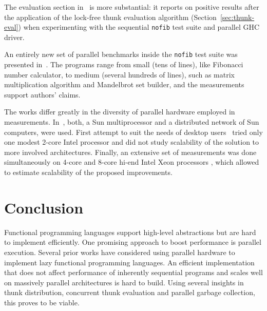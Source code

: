 \documentclass[11pt]{extarticle}
\begin{document}
The evaluation section in~\cite{Harris05} is more substantial: it reports on positive results after the application of the lock-free thunk evaluation algorithm (Section~\ref{sec:thunk-eval}) when experimenting with the sequential \texttt{nofib} test suite and parallel GHC driver.

An entirely new set of parallel benchmarks inside the \texttt{nofib} test suite was presented in~\cite{Marlow09}. The programs range from small (tens of lines), like Fibonacci number calculator, to medium (several hundreds of lines), such as matrix multiplication algorithm and Mandelbrot set builder, and the measurements support authors' claims.

The works differ greatly in the diversity of parallel hardware employed in measurements. In~\cite{Trinder96}, both, a Sun multiprocessor and a distributed network of Sun computers, were used. First attempt to suit the needs of desktop users~\cite{Harris05} tried only one modest 2-core Intel processor and did not study scalability of the solution to more involved architectures. Finally, an extensive set of measurements was done simultaneously on 4-core and 8-core hi-end Intel Xeon processors \cite{Marlow09}, which allowed to estimate scalability of the proposed improvements.

\section{Conclusion}

Functional programming languages support high-level abstractions but are hard to implement efficiently. One promising approach to boost performance is parallel execution. Several prior works have considered using parallel hardware to implement lazy functional programming languages. An efficient implementation that does not affect performance of inherently sequential programs and scales well on massively parallel architectures is hard to build. Using several insights in thunk distribution, concurrent thunk evaluation and parallel garbage collection, this proves to be viable.

\small
\nocite{*}


\end{document}

